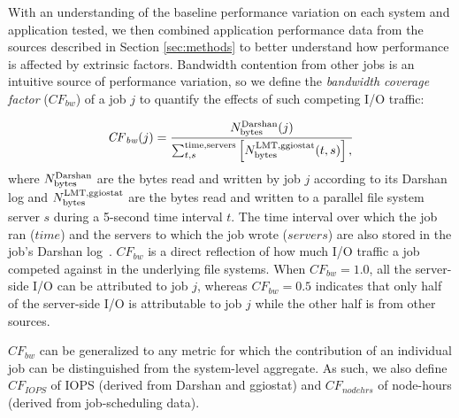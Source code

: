 With an understanding of the baseline performance variation on each system and application tested, we then combined application performance data from the sources described in Section \ref{sec:methods} to better understand how performance is affected by extrinsic factors.
Bandwidth contention from other jobs is an intuitive source of performance variation, so we define the \emph{bandwidth coverage factor} ($\mathit{CF}_{\mathit{bw}}$) of a job $j$ to quantify the effects of such competing I/O traffic:

\begin{equation} \label{eq:cf}
    \mathit{CF}_{\mathit{bw}}(j) = \frac{N_{\textup{bytes}}^{\textup{Darshan}}(j)}
    {\sum_{t,s}^{\textup{time,servers}}
    \left [ N_{\textup{bytes}}^{\textup{LMT,ggiostat}}(t,s) \right ] , }
\end{equation}
%
where 
$N_{\textup{bytes}}^{\textup{Darshan}}$ are the bytes read and written by job $j$ according to its Darshan log and 
$N_{\textup{bytes}}^{\textup{LMT,ggiostat}}$ are the bytes read and written to a parallel file system server $s$ during a 5-second time interval $t$.
The time interval over which the job ran ($\mathit{time}$) and the servers to which the job wrote ($\mathit{servers}$) are also stored in the job's Darshan log~\cite{snyder2016modular}.
$\mathit{CF}_{\mathit{bw}}$ is a direct reflection of how much I/O traffic a job competed against in the underlying file systems.
When $\mathit{CF}_{\mathit{bw}} = 1.0$, all the server-side I/O can be attributed to job $j$, whereas $\mathit{CF}_{\mathit{bw}} = 0.5$ indicates that only half of the server-side I/O is attributable to job $j$ while the other half is from other sources.

$\mathit{CF}_{\mathit{bw}}$ can be generalized to any metric for which the contribution of an individual job can be distinguished from the system-level aggregate.
As such, we also define $\mathit{CF}_{\mathit{IOPS}}$ of IOPS (derived from Darshan and ggiostat) and $\mathit{CF}_{\mathit{nodehrs}}$ of node-hours (derived from job-scheduling data).


